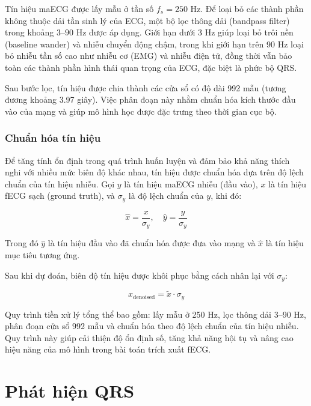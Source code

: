 \documentclass[../DoAn.tex]{subfiles}
\begin{document}
Tín hiệu maECG được lấy mẫu ở tần số $f_s = 250$ Hz. Để loại bỏ các thành phần không thuộc dải tần sinh lý của ECG, một bộ lọc thông dải (bandpass filter) trong khoảng $3$--$90$ Hz được áp dụng. Giới hạn dưới 3 Hz giúp loại bỏ trôi nền (baseline wander) và nhiễu chuyển động chậm, trong khi giới hạn trên 90 Hz loại bỏ nhiễu tần số cao như nhiễu cơ (EMG) và nhiễu điện tử, đồng thời vẫn bảo toàn các thành phần hình thái quan trọng của ECG, đặc biệt là phức bộ QRS.

Sau bước lọc, tín hiệu được chia thành các cửa sổ có độ dài 992 mẫu (tương đương khoảng 3.97 giây). Việc phân đoạn này nhằm chuẩn hóa kích thước đầu vào của mạng và giúp mô hình học được đặc trưng theo thời gian cục bộ.

\subsubsection{Chuẩn hóa tín hiệu}

Để tăng tính ổn định trong quá trình huấn luyện và đảm bảo khả năng thích nghi với nhiều mức biên độ khác nhau, tín hiệu được chuẩn hóa dựa trên độ lệch chuẩn của tín hiệu nhiễu. Gọi $y$ là tín hiệu maECG nhiễu (đầu vào), $x$ là tín hiệu fECG sạch (ground truth), và $\sigma_y$ là độ lệch chuẩn của $y$, khi đó:

\begin{equation}
  \hat{x} = \frac{x}{\sigma_y}, \quad
  \hat{y} = \frac{y}{\sigma_y}
\end{equation}

Trong đó $\hat{y}$ là tín hiệu đầu vào đã chuẩn hóa được đưa vào mạng và $\hat{x}$ là tín hiệu mục tiêu tương ứng.

Sau khi dự đoán, biên độ tín hiệu được khôi phục bằng cách nhân lại với $\sigma_y$:

\begin{equation}
  x_{\text{denoised}} = \tilde{x} \cdot \sigma_y
\end{equation}

Quy trình tiền xử lý tổng thể bao gồm: lấy mẫu ở 250 Hz, lọc thông dải 3--90 Hz, phân đoạn cửa sổ 992 mẫu và chuẩn hóa theo độ lệch chuẩn của tín hiệu nhiễu. Quy trình này giúp cải thiện độ ổn định số, tăng khả năng hội tụ và nâng cao hiệu năng của mô hình trong bài toán trích xuất fECG.

\section{Phát hiện QRS}
\end{document}

